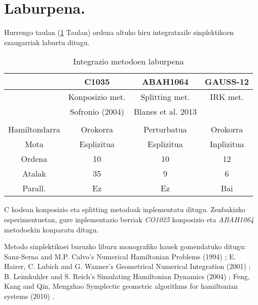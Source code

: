 

\section{Laburpena.}

Hurrengo taulan (\ref{tab:int_sinp} Taulan) ordena altuko hiru integratzaile sinplektikoen ezaugarriak laburtu ditugu. 

\begin{table}[h!]
\centering
\caption{Integrazio metodoen laburpena}
\label{tab:int_sinp}       %
\begin{tabular}{ c|c c c } 
           &  C1035             &  ABAH1064           & GAUSS-12           \\
 \hline
 	       & Konposizio met.    & Splitting met.     & IRK met.            \\
 	       & Sofronio (2004)    & Blanes et al. 2013 &                     \\
 \hline 
               &                    &                    &                 \\
 Hamiltondarra & Orokorra           & Perturbatua        & Orokorra        \\ 	    
 Mota          & Esplizitua         & Esplizitua         & Inplizitua      \\ 
 Ordena        & 10                 & 10                 & 12              \\ 
 Atalak        & 35                 & 9                  & 6               \\ 
 Parall.       & Ez                 & Ez                 & Bai             \\  
\end{tabular}
\end{table}
 
 
 C kodean konposizio eta splitting metodoak inplementatu ditugu. Zenbakizko esperimentuetan, gure inplementazio berriak \emph{CO1025} konposizio eta \emph{ABAH1064} metodoekin konparatu ditugu.
 
 Metodo sinplektikoei buruzko liburu monografiko hauek gomendatuko ditugu: Sanz-Serna and M.P. Calvo’s Numerical Hamiltonian Problems (1994) \cite{JMSanz-Serna1994}; E. Hairer, C. Lubich and G. Wanner’s Geometrical Numerical Integration (2001) \cite{Hairer2006}; B. Leimkuhler and S. Reich’s Simulating Hamiltonian Dynamics (2004) \cite{Leimkuhler2004}; Feng, Kang and Qin, Mengzhao  Symplectic geometric algorithms for hamiltonian systems (2010) \cite{Feng2010}.
